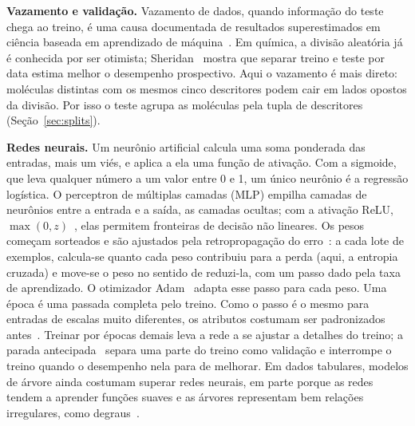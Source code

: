 \textbf{Vazamento e validação.} Vazamento de dados, quando informação do teste chega ao treino, é uma causa documentada de resultados superestimados em ciência baseada em aprendizado de máquina~\cite{kapoor:23}. Em química, a divisão aleatória já é conhecida por ser otimista; Sheridan~\cite{sheridan:13} mostra que separar treino e teste por data estima melhor o desempenho prospectivo. Aqui o vazamento é mais direto: moléculas distintas com os mesmos cinco descritores podem cair em lados opostos da divisão. Por isso o teste agrupa as moléculas pela tupla de descritores (Seção~\ref{sec:splits}).

\textbf{Redes neurais.} Um neurônio artificial calcula uma soma ponderada das entradas, mais um viés, e aplica a ela uma função de ativação. Com a sigmoide, que leva qualquer número a um valor entre 0 e 1, um único neurônio é a regressão logística. O perceptron de múltiplas camadas (MLP) empilha camadas de neurônios entre a entrada e a saída, as camadas ocultas; com a ativação ReLU, $\max(0, z)$~\cite{nair:10}, elas permitem fronteiras de decisão não lineares. Os pesos começam sorteados e são ajustados pela retropropagação do erro~\cite{rumelhart:86}: a cada lote de exemplos, calcula-se quanto cada peso contribuiu para a perda (aqui, a entropia cruzada) e move-se o peso no sentido de reduzi-la, com um passo dado pela taxa de aprendizado. O otimizador Adam~\cite{kingma:15} adapta esse passo para cada peso. Uma época é uma passada completa pelo treino. Como o passo é o mesmo para entradas de escalas muito diferentes, os atributos costumam ser padronizados antes~\cite{lecun:98}. Treinar por épocas demais leva a rede a se ajustar a detalhes do treino; a parada antecipada~\cite{prechelt:98} separa uma parte do treino como validação e interrompe o treino quando o desempenho nela para de melhorar. Em dados tabulares, modelos de árvore ainda costumam superar redes neurais, em parte porque as redes tendem a aprender funções suaves e as árvores representam bem relações irregulares, como degraus~\cite{grinsztajn:22}.
